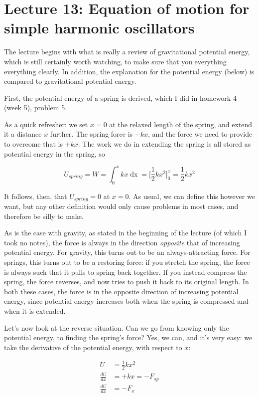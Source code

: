 
\section{Lecture 13: Equation of motion for simple harmonic oscillators}

The lecture begins with what is really a review of gravitational potential energy, which is still certainly worth watching, to make sure that you everything everything clearly. In addition, the explanation for the potential energy (below) is compared to gravitational potential energy.

First, the potential energy of a spring is derived, which I did in homework 4 (week 5), problem 5.

As a quick refresher: we set $x = 0$ at the relaxed length of the spring, and extend it a distance $x$ further. The spring force is $-k x$, and the force we need to provide to overcome that is $+ k x$. The work we do in extending the spring is all stored as potential energy in the spring, so

\begin{equation}
U_{spring} = W = \int_0^x k x \mathop{dx} = \Big[\frac{1}{2} k x^2\Big]_0^x = \frac{1}{2} k x^2
\end{equation}

It follows, then, that $U_{spring} = 0$ at $x = 0$. As usual, we can define this however we want, but any other definition would only cause problems in most cases, and therefore be silly to make.

As is the case with gravity, as stated in the beginning of the lecture (of which I took no notes), the force is always in the direction \emph{opposite} that of increasing potential energy. For gravity, this turns out to be an always-attracting force. For springs, this turns out to be a restoring force: if you stretch the spring, the force is always such that it pulls to spring back together. If you instead compress the spring, the force reverses, and now tries to push it back to its original length. In both these cases, the force is in the opposite direction of increasing potential energy, since potential energy increases both when the spring is compressed and when it is extended.

Let's now look at the reverse situation. Can we go from knowing only the potential energy, to finding the spring's force? Yes, we can, and it's very easy: we take the derivative of the potential energy, with respect to $x$:

\begin{align}
U &= \frac{1}{2} k x^2\\
\frac{dU}{dx} &= + k x = - F_{sp}\\
\frac{dU}{dx} &= -F_x
\end{align}

